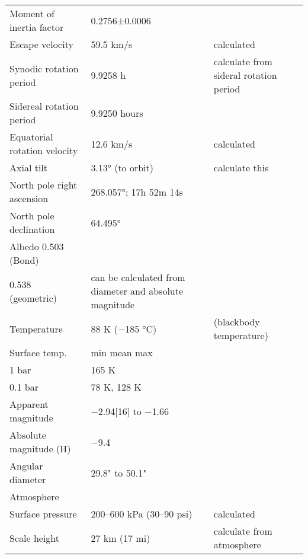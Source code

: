 \begin{tabular}{ | l | l | p{3cm}|}
Moment of inertia factor&0.2756±0.0006 & \\
Escape velocity&59.5 km/s & calculated\\
Synodic rotation period&9.9258 h & calculate from sideral rotation period \\
Sidereal rotation period&9.9250 hours  & \\
Equatorial rotation velocity&12.6 km/s & calculated\\
Axial tilt&3.13° (to orbit) & calculate this\\
North pole right ascension&268.057°; 17h 52m 14s & \\
North pole declination&64.495° & \\
Albedo  
0.503 (Bond)  & \\
0.538 (geometric) & can be calculated from diameter and absolute magnitude\\
Temperature&88 K (−185 °C)  & (blackbody temperature) \\
Surface temp.&min mean max  \\
1 bar& 165 K & \\
0.1 bar&78 K, 128 K& \\
Apparent magnitude&−2.94[16] to −1.66 & \\
Absolute magnitude (H)&−9.4 & \\
Angular diameter&29.8" to 50.1" & \\
\hline
Atmosphere & \\
\hline
Surface pressure&200–600 kPa (30–90 psi) & calculated\\
Scale height&27 km (17 mi)  &  calculate from atmosphere\\
\end{tabular}
